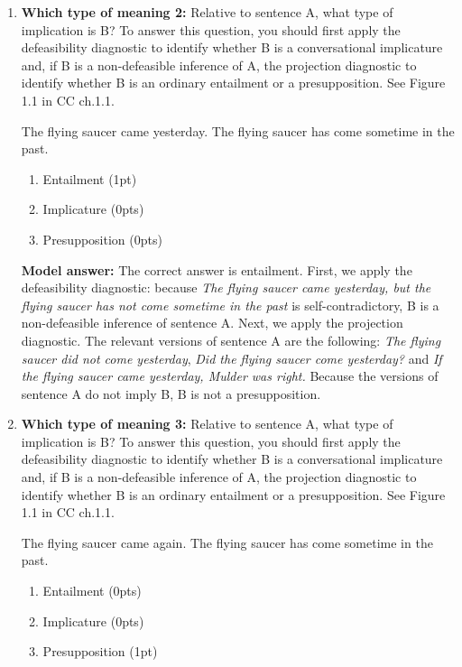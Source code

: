 \documentclass[a4,11pt]{article}
\begin{document}
\begin{enumerate}[leftmargin = 12pt]
 \item {\bf Which type of meaning 2:} Relative to sentence A, what type of implication is B? To answer this question, you should first apply the defeasibility diagnostic to identify whether B is a conversational implicature and, if B is a non-defeasible inference of A, the projection diagnostic to identify whether B is an ordinary entailment or a presupposition. See Figure 1.1 in CC ch.1.1.
\begin{exe}
\exi{}
\begin{xlist}
  The flying saucer came yesterday.
 The flying saucer has come sometime in the past.
\end{xlist}
\end{exe}
   \begin{enumerate}[noitemsep]
        \item Entailment (1pt)
         \item Implicature (0pts)
           \item Presupposition (0pts)
    \end{enumerate}

 {\bf Model answer:} The correct answer is entailment. First, we apply the defeasibility diagnostic: because {\em The flying saucer came yesterday, but the flying saucer has not come sometime in the past} is self-contradictory, B is a non-defeasible inference of sentence A. Next, we apply the projection diagnostic. The relevant versions of sentence A are the following: {\em The flying saucer did not come yesterday}, {\em Did the flying saucer come yesterday?} and {\em If the flying saucer came yesterday, Mulder was right.} Because the versions of sentence A do not imply B, B is not a presupposition. 

  
 \item {\bf Which type of meaning 3:} Relative to sentence A, what type of implication is B? To answer this question, you should first apply the defeasibility diagnostic to identify whether B is a conversational implicature and, if B is a non-defeasible inference of A, the projection diagnostic to identify whether B is an ordinary entailment or a presupposition. See Figure 1.1 in CC ch.1.1.

\begin{exe}
\exi{}
\begin{xlist}
  The flying saucer came again.
 The flying saucer has come sometime in the past.
\end{xlist}
\end{exe}
   \begin{enumerate}[noitemsep]
        \item Entailment (0pts)
         \item Implicature (0pts)
           \item Presupposition (1pt)
    \end{enumerate}
    

\end{enumerate}
\end{document}
